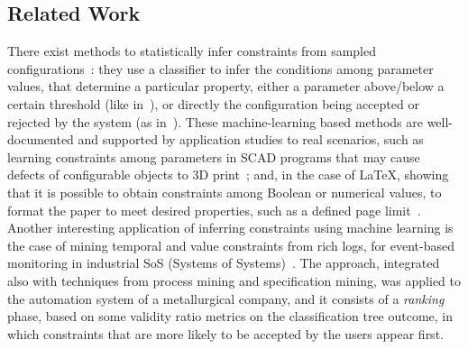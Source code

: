\begin{tikzborder}{\cite{Gargantini16:validation}}
\begin{tikzborder}{\cite{gargantini_combinatorial_2017}}
\begin{tikzborder}{\cite{garn2019}}
\begin{tikzborder}{\cite{arcaini2019achieving}}
\begin{tikzborder}{\cite{arcaini2019varivolution}}
		\subsection{Related Work}\label{sec:fmrelatedwork2}
		\bb There exist methods to statistically infer constraints from sampled configurations~\cite{chiang_unified_2011,Abukwaik_2016, temple_towards_2018,temple_learning_2017,Temple16:using,amand_towards_2019}: they use a classifier to infer the conditions among parameter values, that determine a particular property, either a parameter above/below a certain threshold (like in~\cite{temple_learning_2017}), or directly the configuration being accepted or rejected by the system (as in~\cite{Temple16:using}). These machine-learning based methods are well-documented and supported by application studies to real scenarios, such as learning constraints among parameters in SCAD programs that may cause defects of configurable objects to 3D print~\cite{amand_towards_2019}; and, in the case of \LaTeX, showing that it is possible to obtain constraints among Boolean or numerical values, to format the paper to meet desired properties, such as a defined page limit~\cite{acher_varylatex:_2018}. Another interesting application of inferring constraints using machine learning is the case of mining temporal and value constraints from rich logs, for event-based monitoring in industrial SoS (Systems of Systems)~\cite{krismayer_mining_2017}. The approach, integrated also with techniques from process mining and specification mining, was applied to the automation system of a metallurgical company, and it consists of a \textit{ranking} phase, based on some validity ratio metrics on the classification tree outcome, in which constraints that are more likely to be accepted by the users appear first.
		

\end{tikzborder}
\end{tikzborder}
\end{tikzborder}
\end{tikzborder}
\end{tikzborder}
